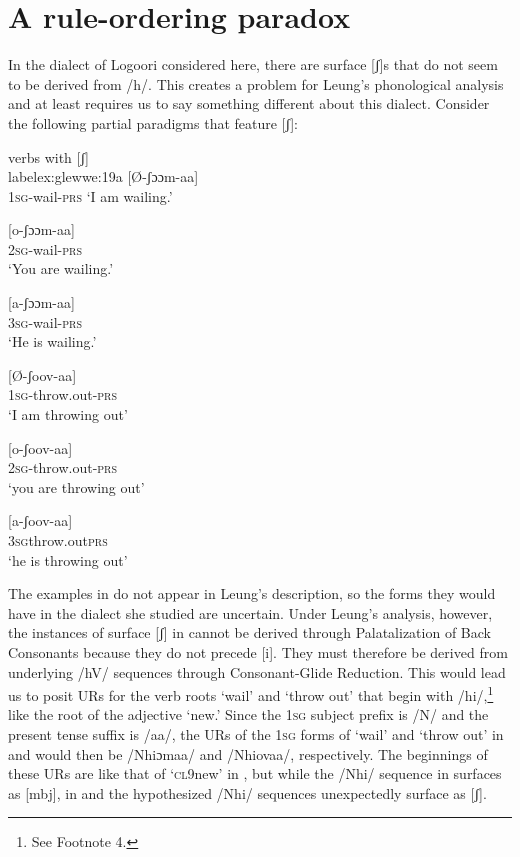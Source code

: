 \documentclass[output=paper]{langsci/langscibook}
\begin{document}
\section{A rule-ordering paradox}

In the dialect of Logoori considered here, there are surface [ʃ]s that do not seem to be derived from /h/. This creates a problem for Leung’s phonological analysis and at least requires us to say something different about this dialect. Consider the following partial paradigms that feature [ʃ]:


\ea\label{ex:glewwe:19}
{verbs with [ʃ]}
  \ea\\label{ex:glewwe:19a}
  [Ø-ʃɔɔm-aa] \\
\textsc{1sg}-wail-\textsc{prs}  
\glt ‘I am wailing.’


\ex\label{ex:glewwe:19b}{}
 [o-ʃɔɔm-aa] \\
\textsc{2sg}-wail-\textsc{prs}  \\
\glt ‘You are wailing.’


\ex\label{ex:glewwe:19c}{} 
[a-ʃɔɔm-aa] \\
\textsc{3sg}-wail-\textsc{prs}\\
\glt ‘He is wailing.’


\ex\label{ex:glewwe:19d}{} 
[Ø-ʃoov-aa]  \\
\textsc{1sg}-throw.out-\textsc{prs} \\
\glt ‘I am throwing out’


\ex\label{ex:glewwe:19e}{}
 [o-ʃoov-aa]  \\
\textsc{2sg}-throw.out-\textsc{prs} \\
\glt ‘you are throwing out’

\ex\label{ex:glewwe:19f}{}
 [a-ʃoov-aa]  \\
\textsc{3sg}throw.out\textsc{prs} \\
\glt ‘he is throwing out’
\z
\z 

The examples in  do not appear in Leung’s description, so the forms they would have in the dialect she studied are uncertain. Under Leung’s analysis, however, the instances of surface [ʃ] in  cannot be derived through Palatalization of Back Consonants because they do not precede [i]. They must therefore be derived from underlying /hV/ sequences through Consonant-Glide Reduction. This would lead us to posit URs for the verb roots ‘wail’ and ‘throw out’ that begin with /hi/,\footnote{See Footnote 4.} like the root of the adjective ‘new.’ Since the 1\textsc{sg} subject prefix is /N/ and the present tense suffix is /aa/, the URs of the 1\textsc{sg} forms of ‘wail’ and ‘throw out’ in  and  would then be /Nhiɔmaa/ and /Nhiovaa/, respectively. The beginnings of these URs are like that of ‘\textsc{cl}9new’ in , but while the /Nhi/ sequence in  surfaces as [mbj], in  and  the hypothesized /Nhi/ sequences unexpectedly surface as [ʃ]. 
\end{document}
